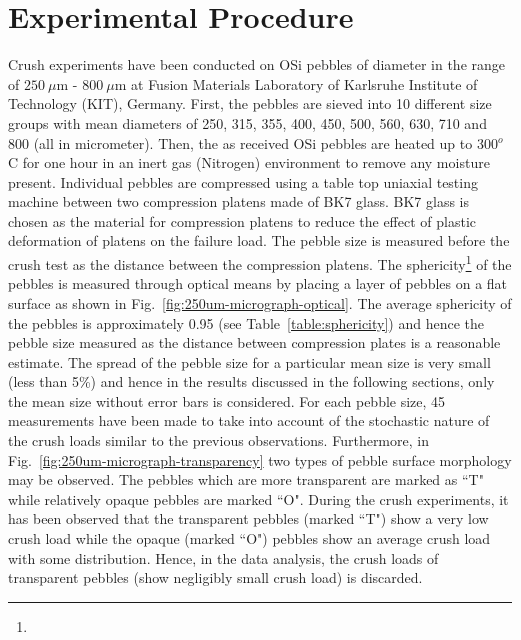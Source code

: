 \section{Experimental Procedure}\label{sec:method}
Crush experiments have been conducted on OSi pebbles of diameter in the range of $250~\mu$m - $800~\mu$m at Fusion Materials Laboratory of Karlsruhe Institute of Technology (KIT), Germany. First, the pebbles are sieved into 10 different size groups with mean diameters of 250, 315, 355, 400, 450, 500, 560, 630, 710 and 800 (all in micrometer).  Then, the as received OSi pebbles are heated up to 300$^o$C for one hour in an inert gas (Nitrogen) environment to remove any moisture present. Individual pebbles are compressed  using a table top uniaxial testing machine between two compression platens made of BK7 glass. BK7 glass is chosen as the material for compression platens to reduce the effect of plastic deformation of platens on the failure load.\citep{Zhao2013}  The pebble size is measured before the crush test as the distance between the compression platens. The sphericity\footnote{} of the pebbles is measured through optical means by placing a layer of pebbles on a flat surface as shown in Fig.~\ref{fig:250um-micrograph-optical}. The average sphericity of the pebbles is approximately 0.95 (see Table~\ref{table:sphericity}) and hence the pebble size measured as the distance between compression plates is a reasonable estimate. The spread of the pebble size for a particular mean size is very small (less than 5\%) and hence in the results discussed in the following sections, only the mean size without error bars is considered. For each pebble size, 45 measurements have been made to take into account of the stochastic nature of the crush loads similar to the previous observations.\citep{Annabattula2012a} Furthermore, in Fig.~\ref{fig:250um-micrograph-transparency} two types of pebble surface morphology may be observed. The pebbles which are more transparent are marked as ``T" while relatively opaque pebbles are marked ``O". During the crush experiments, it has been observed that the transparent pebbles (marked ``T") show a very low crush load while the opaque (marked ``O") pebbles show an average crush load with some distribution. Hence, in the data analysis, the crush loads of transparent pebbles (show negligibly small crush load) is discarded. 
